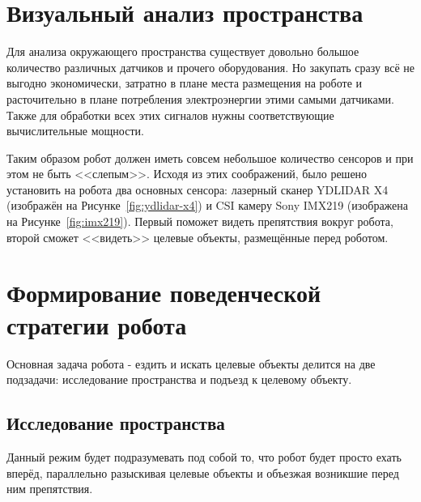 \section{Визуальный анализ пространства}
Для анализа окружающего пространства существует довольно большое количество различных датчиков и прочего оборудования\cite{robots-sensors}. Но закупать сразу всё не выгодно экономически, затратно в плане места размещения на роботе и расточительно в плане потребления электроэнергии этими самыми датчиками. Также для обработки всех этих сигналов нужны соответствующие вычислительные мощности. 

Таким образом робот должен иметь совсем небольшое количество сенсоров и при этом не быть <<слепым>>. Исходя из этих соображений, было решено установить на робота два основных сенсора: лазерный сканер YDLIDAR X4 (изображён на Рисунке~\ref{fig:ydlidar-x4}) и CSI камеру Sony IMX219 (изображена на Рисунке~\ref{fig:imx219}). Первый поможет видеть препятствия вокруг робота, второй сможет <<видеть>> целевые объекты, размещённые перед роботом. 

\begin{figure}[ht]
\end{figure}


\section{Формирование поведенческой стратегии робота}

Основная задача робота - ездить и искать целевые объекты делится на две подзадачи: исследование пространства и подъезд к целевому объекту.

\subsection{Исследование пространства}

Данный режим будет подразумевать под собой то, что робот будет просто ехать вперёд, параллельно разыскивая целевые объекты и объезжая возникшие перед ним препятствия. 

